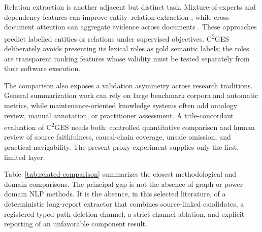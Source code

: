 \documentclass[applsci,article,submit,moreauthors]{Definitions/mdpi}
\newcommand{\cges}{C\textsuperscript{2}GES}
\begin{document}
Relation extraction is another adjacent but distinct task. Mixture-of-experts and dependency features can improve entity--relation extraction \cite{li2025moere}, while cross-document attention can aggregate evidence across documents \cite{she2025clear}. These approaches predict labelled entities or relations under supervised objectives. \cges{} deliberately avoids presenting its lexical roles as gold semantic labels; the roles are transparent ranking features whose validity must be tested separately from their software execution.

The comparison also exposes a validation asymmetry across research traditions. General summarization work can rely on large benchmark corpora and automatic metrics, while maintenance-oriented knowledge systems often add ontology review, manual annotation, or practitioner assessment. A title-concordant evaluation of \cges{} needs both: controlled quantitative comparison and human review of source faithfulness, causal-chain coverage, unsafe omission, and practical navigability. The present proxy experiment supplies only the first, limited layer.

Table~\ref{tab:related-comparison} summarizes the closest methodological and domain comparisons. The principal gap is not the absence of graph or power-domain NLP methods. It is the absence, in this selected literature, of a deterministic long-report extractor that combines source-linked candidates, a registered typed-path deletion channel, a strict channel ablation, and explicit reporting of an unfavorable component result.
\end{document}
